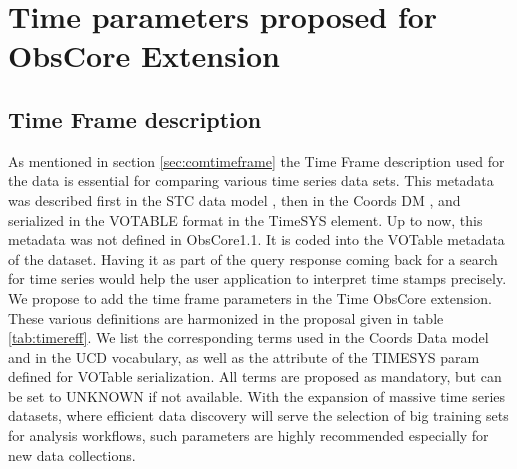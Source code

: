 \documentclass[11pt,a4paper]{ivoa}
\begin{document}
 \section{Time parameters proposed for ObsCore Extension }
 \label{sec:timeext}

  \subsection{Time Frame description}
 As mentioned in section \ref{sec:comtimeframe} the Time Frame description used for the data is essential for comparing various time series data sets.
This metadata was described first in the STC data model  \citep{2007ivoa.spec.1030R}, then  in the Coords DM \citep{2022ivoa.specQ1004R}, and serialized in the  VOTABLE format in the TimeSYS element.
Up to now, this metadata  was not defined in ObsCore1.1. It is coded into the VOTable  metadata of the dataset.
Having  it as  part of the query response coming back for a search for time series would help the user application to interpret time stamps precisely.
We propose to add the time frame parameters in the Time ObsCore extension.
These various definitions are harmonized in the proposal given in  table \ref{tab:timereff}. We list the corresponding terms used in the Coords Data model and in the UCD vocabulary, as well as the attribute of the TIMESYS param defined for VOTable serialization.
All terms are proposed as mandatory, but can be set to UNKNOWN if not available.
With the expansion of massive time series datasets, where efficient data discovery will serve the selection of big training sets for analysis workflows,
such parameters are highly recommended especially for new data collections.
\end{document}
